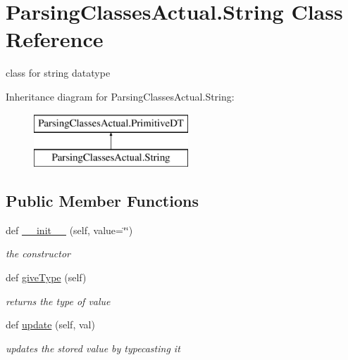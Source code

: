 \hypertarget{class_parsing_classes_actual_1_1_string}{}\section{Parsing\+Classes\+Actual.\+String Class Reference}
\label{class_parsing_classes_actual_1_1_string}


class for string datatype  


Inheritance diagram for Parsing\+Classes\+Actual.\+String\+:\begin{figure}[H]
\begin{center}
\leavevmode
\includegraphics[height=2.000000cm]{class_parsing_classes_actual_1_1_string}
\end{center}
\end{figure}
\subsection*{Public Member Functions}
\begin{DoxyCompactItemize}
\item 
def \hyperlink{class_parsing_classes_actual_1_1_string_a8f97f0ea4e268f51804084ae84435c52}{\+\_\+\+\_\+init\+\_\+\+\_\+} (self, value=\textquotesingle{}\char`\"{}\char`\"{}\textquotesingle{})
\begin{DoxyCompactList}\small\item\em the constructor \end{DoxyCompactList}\item 
\mbox{\label{class_parsing_classes_actual_1_1_string_a292e4be2531c8eb3d6aa6f328defdad7}} 
def \hyperlink{class_parsing_classes_actual_1_1_string_a292e4be2531c8eb3d6aa6f328defdad7}{give\+Type} (self)
\begin{DoxyCompactList}\small\item\em returns the type of value \end{DoxyCompactList}\item 
\mbox{\label{class_parsing_classes_actual_1_1_string_aa1f293f1e6aebb5522bb65ecfcce9051}} 
def \hyperlink{class_parsing_classes_actual_1_1_string_aa1f293f1e6aebb5522bb65ecfcce9051}{update} (self, val)
\begin{DoxyCompactList}\small\item\em updates the stored value by typecasting it \end{DoxyCompactList}\end{DoxyCompactItemize}
